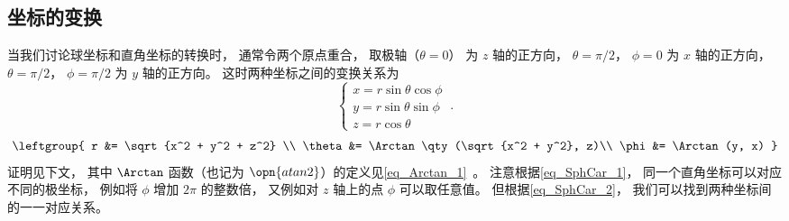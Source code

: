

\subsection{坐标的变换}
当我们讨论球坐标和直角坐标的转换时， 通常令两个原点重合， 取极轴（$\theta = 0$） 为 $z$ 轴的正方向， $\theta = \pi/2$， $\phi = 0$ 为 $x$ 轴的正方向， $\theta = \pi/2$， $\phi = \pi/2$ 为 $y$ 轴的正方向。 这时两种坐标之间的变换关系为
\begin{equation}\label{eq_SphCar_1}
\begin{cases}
x = r\sin \theta \cos \phi \\
y = r\sin \theta \sin \phi \\
z = r\cos \theta 
\end{cases}~.
\end{equation}
\begin{equation}\label{eq_SphCar_2}
\leftgroup{
r &= \sqrt {x^2 + y^2 + z^2} \\
\theta  &= \Arctan\qty(\sqrt{x^2 + y^2}, z)\\
\phi  &= \Arctan(y, x)
}\end{equation}
证明见下文， 其中 $\Arctan$ 函数（也记为 $\opn{atan2}$）的定义见\autoref{eq_Arctan_1}~。 注意根据\autoref{eq_SphCar_1}， 同一个直角坐标可以对应不同的极坐标， 例如将 $\phi$ 增加 $2\pi$ 的整数倍， 又例如对 $z$ 轴上的点 $\phi$ 可以取任意值。 但根据\autoref{eq_SphCar_2}， 我们可以找到两种坐标间的一一对应关系。

